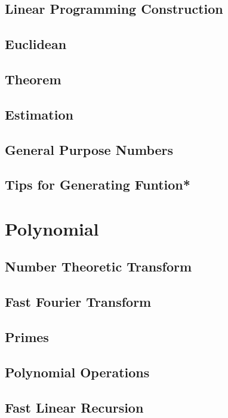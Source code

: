 \subsection{Linear Programming Construction}

\subsection{Euclidean}

\subsection{Theorem}

\subsection{Estimation}

\subsection{General Purpose Numbers}

\subsection{Tips for Generating Funtion*}


\section{Polynomial}
\subsection{Number Theoretic Transform}

\subsection{Fast Fourier Transform}

\subsection{Primes}

\subsection{Polynomial Operations}

\subsection{Fast Linear Recursion}

